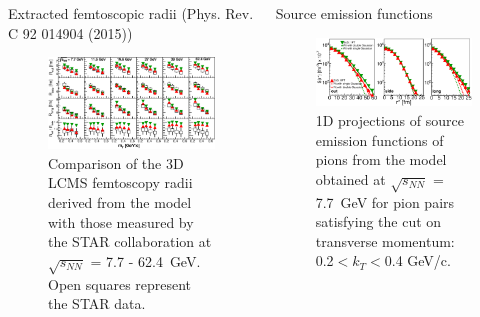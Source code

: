 \documentclass[final,hyperref={pdfpagelabels=false}, xcolor=dvipsnames]{beamer}
\begin{document}
\begin{frame}[shrink=30]
\begin{columns}[t]
 \begin{block}{Extracted femtoscopic radii (Phys. Rev. C 92 014904 (2015))}
      \begin{figure}[H]
      \caption{Comparison of the 3D LCMS femtoscopy radii derived from the model 
      with those measured by the STAR collaboration at \newline $\sqrt{s_{NN}}$ = 7.7 - 62.4~GeV. Open squares represent the STAR data.}
         \includegraphics[width=1.0\linewidth]{fig4_poster.eps}
      \end{figure}
   \end{block}
   
 
   \begin{block}{Source emission functions}
     \begin{figure}[H]
 \caption{1D projections of source emission functions of pions 
 from the model obtained at $\sqrt{s_{NN}}$ = 7.7~GeV for pion pairs satisfying the cut on transverse momentum: 0.2$ < k_{T} < $0.4 GeV/c.}
         \includegraphics[width=1.\linewidth]{fig6_poster.eps}
 \end{figure}
 \end{block}
 

\end{columns}
\end{frame}
\end{document}
